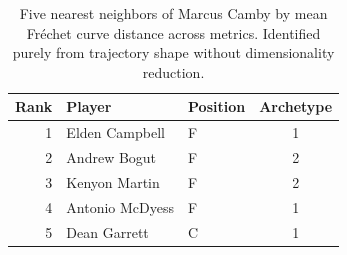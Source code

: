 \begin{table}[htbp]
  \centering\small
  \begin{tabular}{rllc}
    \toprule
    Rank & Player & Position & Archetype \\
    \midrule
    1 & Elden Campbell & F & 1 \\
    2 & Andrew Bogut & F & 2 \\
    3 & Kenyon Martin & F & 2 \\
    4 & Antonio McDyess & F & 1 \\
    5 & Dean Garrett & C & 1 \\
    \bottomrule
  \end{tabular}
  \caption{Five nearest neighbors of Marcus Camby by mean Fr\'{e}chet curve distance across metrics. Identified purely from trajectory shape without dimensionality reduction.}
  \label{tab:Marcus_Camby_frechet_curve_neighbors}
\end{table}

